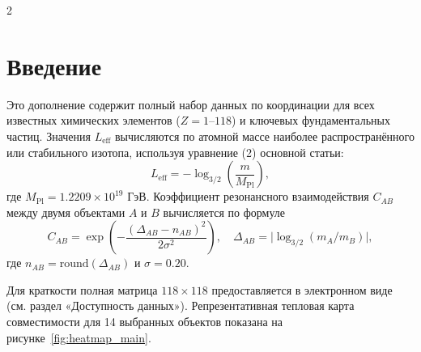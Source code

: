 \documentclass[11pt,a4paper]{article}
\begin{document}
	\begin{multicols}{2}
		\section*{Введение}
		Это дополнение содержит полный набор данных по координации для всех известных химических элементов (\(Z = 1\)–\(118\)) и ключевых фундаментальных частиц. Значения \(L_{\mathrm{eff}}\) вычисляются по атомной массе наиболее распространённого или стабильного изотопа, используя уравнение (2) основной статьи:
		\[
		L_{\mathrm{eff}} = -\log_{3/2}\!\left( \frac{m}{M_{\mathrm{Pl}}} \right),
		\]
		где \(M_{\mathrm{Pl}} = 1.2209\times 10^{19}\) ГэВ. Коэффициент резонансного взаимодействия \(C_{AB}\) между двумя объектами \(A\) и \(B\) вычисляется по формуле
		\[
		C_{AB} = \exp\!\left( - \frac{(\Delta_{AB} - n_{AB})^2}{2\sigma^2} \right),\quad
		\Delta_{AB} = \bigl|\log_{3/2}(m_A/m_B)\bigr|,
		\]
		где \(n_{AB} = \text{round}(\Delta_{AB})\) и \(\sigma = 0.20\).
		
		Для краткости полная матрица \(118\times118\) предоставляется в электронном виде (см. раздел «Доступность данных»). Репрезентативная тепловая карта совместимости для 14 выбранных объектов показана на рисунке~\ref{fig:heatmap_main}.
	\end{multicols}
	
\end{document}

